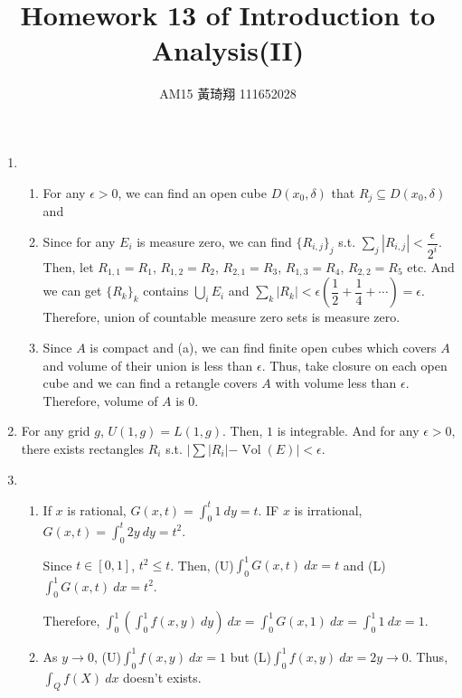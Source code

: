 \documentclass[12pt]{article}
\title{Homework 13 of Introduction to Analysis(II)}
\author{AM15 黃琦翔 111652028}
\DeclareMathOperator{\volume}{Vol}
\begin{document}
\maketitle
\begin{enumerate}
    \item \begin{enumerate}
        \item For any $\epsilon > 0$, 
        we can find an open cube $D(x_0, \delta)$ that $R_j \subseteq D(x_0, \delta)$ and 

        \item Since for any $E_i$ is measure zero, we can find $\{ R_{i, j}\}_j$ s.t. 
        $\displaystyle\sum_{j} |R_{i, j}| < \dfrac{\epsilon}{2^{i}}$.
        Then, let $R_{1, 1} = R_1$, $R_{1,2} = R_2$, $R_{2, 1} = R_3$, $R_{1, 3} = R_4$, $R_{2, 2} = R_5$ etc.
        And we can get $\{ R_k\}_k$ contains $\displaystyle\bigcup_i E_i$ and $\displaystyle\sum_{k} |R_k| < \epsilon(\dfrac{1}{2} + \dfrac{1}{4} + \cdots) = \epsilon$.
        Therefore, union of countable measure zero sets is measure zero.

        \item Since $A$ is compact and (a), we can find finite open cubes which covers $A$ and volume of their union is less than $\epsilon$.
        Thus, take closure on each open cube and we can find a retangle covers $A$ with volume less than $\epsilon$.
        Therefore, volume of $A$ is $0$.
    \end{enumerate}

    \item For any grid $g$, $U(1, g) = L(1, g)$. Then, $1$ is integrable.
    And for any $\epsilon > 0$, there exists rectangles $R_i$ s.t. $|\sum |R_i| - \volume(E)| <\epsilon$.

    \item \begin{enumerate}
        \item If $x$ is rational, $G(x, t) = \displaystyle\int_{0}^{t} 1\ dy = t$.
        IF $x$ is irrational, $G(x, t) = \displaystyle\int_{0}^{t} 2y\ dy = t^2$.

        Since $t \in [0, 1]$, $t^2 \leq t$.
        Then, (U)$\displaystyle\int_{0}^{1} G(x, t)\ dx = t$ and (L)$\displaystyle\int_{0}^{1} G(x, t)\ dx = t^2$.

        Therefore, $\displaystyle\int_{0}^{1} (\displaystyle\int_{0}^{1} f(x, y)\ dy)\ dx = \displaystyle\int_{0}^{1} G(x, 1)\ dx = \displaystyle\int_{0}^{1} 1\ dx = 1$.

        \item As $y \to 0$, (U)$\displaystyle\int_{0}^{1} f(x, y)\ dx = 1$ but (L)$\displaystyle\int_{0}^{1} f(x, y)\ dx = 2y \to 0$.
        Thus, $\displaystyle\int_{Q} f(X)\ dx$ doesn't exists.
    \end{enumerate}
\end{enumerate}
\end{document}
